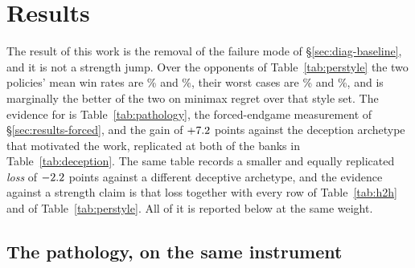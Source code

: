 \section{Results}
\label{sec:results}

\renewcommand{\topfraction}{0.92}
\renewcommand{\bottomfraction}{0.75}
\renewcommand{\textfraction}{0.06}
\renewcommand{\floatpagefraction}{0.80}
\setcounter{topnumber}{3}
\setcounter{bottomnumber}{2}
\setcounter{totalnumber}{4}
\setlength{\textfloatsep}{12pt plus 2pt minus 4pt}
\setlength{\floatsep}{10pt plus 2pt minus 3pt}
\setlength{\intextsep}{12pt plus 2pt minus 3pt}

The result of this work is the removal of the failure mode of
\S\ref{sec:diag-baseline}, and it is not a strength jump. Over the
\numVfiveStyleN{} opponents of Table~\ref{tab:perstyle} the two policies' mean
win rates are \numVfiveMean\% and \numVfourMean\%, their worst cases are
\numVfiveWorst\% and \numVfourWorst\%, and \vfour{} is marginally the better of
the two on minimax regret over that style set. The evidence for \vfive{} is
Table~\ref{tab:pathology}, the forced-endgame measurement of
\S\ref{sec:results-forced}, and the gain of $+7.2$ points
against the deception archetype that motivated the work, replicated at both of
the banks in Table~\ref{tab:deception}. The same table records a smaller and
equally replicated \emph{loss} of $-2.2$ points against a different
deceptive archetype, and the evidence against a strength claim is that loss
together with every row of Table~\ref{tab:h2h} and of Table~\ref{tab:perstyle}.
All of it is reported below at the same weight.

\subsection{The pathology, on the same instrument}
\label{sec:results-pathology}

